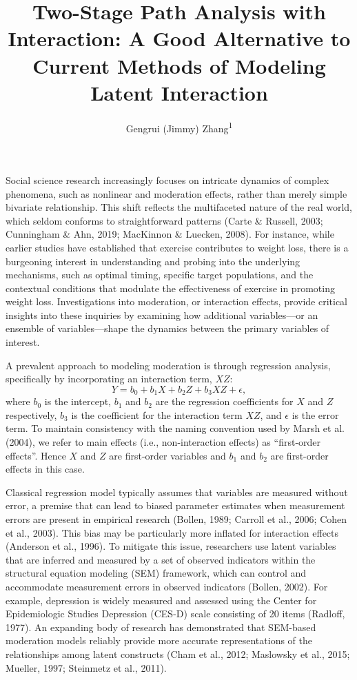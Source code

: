 \documentclass[
  man]{apa6}
\title{Two-Stage Path Analysis with Interaction: A Good Alternative to Current Methods of Modeling Latent Interaction}
\author{Gengrui (Jimmy) Zhang\textsuperscript{1}}
\date{}
\affiliation{\vspace{0.5cm}\textsuperscript{1} University of Southhern California}
\begin{document}
\maketitle

Social science research increasingly focuses on intricate dynamics of complex phenomena, such as nonlinear and moderation effects, rather than merely simple bivariate relationship. This shift reflects the multifaceted nature of the real world, which seldom conforms to straightforward patterns (Carte \& Russell, 2003; Cunningham \& Ahn, 2019; MacKinnon \& Luecken, 2008). For instance, while earlier studies have established that exercise contributes to weight loss, there is a burgeoning interest in understanding and probing into the underlying mechanisms, such as optimal timing, specific target populations, and the contextual conditions that modulate the effectiveness of exercise in promoting weight loss. Investigations into moderation, or interaction effects, provide critical insights into these inquiries by examining how additional variables---or an ensemble of variables---shape the dynamics between the primary variables of interest.

A prevalent approach to modeling moderation is through regression analysis, specifically by incorporating an interaction term, \(XZ\):
\begin{equation}
Y = b_{0} + b_{1}X + b_{2}Z + b_{3}XZ + \epsilon,
\end{equation}
where \(b_{0}\) is the intercept, \(b_{1}\) and \(b_{2}\) are the regression coefficients for \(X\) and \(Z\) respectively, \(b_{3}\) is the coefficient for the interaction term \(XZ\), and \(\epsilon\) is the error term. To maintain consistency with the naming convention used by Marsh et al. (2004), we refer to main effects (i.e., non-interaction effects) as ``first-order effects''. Hence \(X\) and \(Z\) are first-order variables and \(b_{1}\) and \(b_{2}\) are first-order effects in this case.

Classical regression model typically assumes that variables are measured without error, a premise that can lead to biased parameter estimates when measurement errors are present in empirical research (Bollen, 1989; Carroll et al., 2006; Cohen et al., 2003). This bias may be particularly more inflated for interaction effects (Anderson et al., 1996). To mitigate this issue, researchers use latent variables that are inferred and measured by a set of observed indicators within the structural equation modeling (SEM) framework, which can control and accommodate measurement errors in observed indicators (Bollen, 2002). For example, depression is widely measured and assessed using the Center for Epidemiologic Studies Depression (CES-D) scale consisting of 20 items (Radloff, 1977). An expanding body of research has demonstrated that SEM-based moderation models reliably provide more accurate representations of the relationships among latent constructs (Cham et al., 2012; Maslowsky et al., 2015; Mueller, 1997; Steinmetz et al., 2011).
\end{document}
